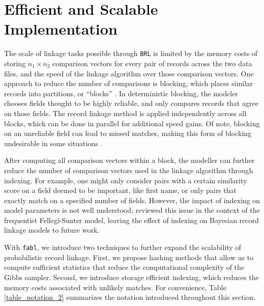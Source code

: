 \documentclass[ba]{imsart}
\begin{document}
\section{Efficient and Scalable Implementation}
\label{sec:efficiency}

The scale of linkage tasks possible through \texttt{BRL} is limited by the memory costs of storing $n_1 \times n_2$ comparison vectors for every pair of records across the two data files, and the speed of the linkage algorithm over those comparison vectors. One approach to reduce the number of comparisons is blocking, which places similar records into partitions, or ``blocks'' \citep{christen2019data}. In deterministic blocking, the modeler chooses fields thought to be highly reliable, and only compares records that agree on those fields. The record linkage method is  applied independently across all blocks, which can be done in parallel for additional speed gains. Of note, blocking on an unreliable field can lead to missed matches, making this form of blocking undesirable in some situations \citep{steorts_comparison_2014}.

After computing all comparison vectors within a block, the modeller can further reduce the number of comparison vectors used in the linkage algorithm through indexing. For example, one might only consider pairs with a certain similarity score on a field deemed to be important, like first name, or only pairs that exactly match on a specified number of fields. However, the impact of indexing on model parameters is not well understood; \citep{murray2016probabilistic} reviewed this issue in the context of the frequentist Fellegi-Sunter model, leaving the effect of indexing on Bayesian record linkage models to future work.

With \texttt{fabl}, we introduce two techniques to further expand the scalability of probabilistic record linkage. First, we propose hashing methods that allow us to compute sufficient statistics that reduce the computational complexity of the Gibbs sampler. Second, we introduce storage efficient indexing, which reduces the memory costs associated with unlikely matches. For convenience, Table \ref{table_notation_2} summarizes the notation introduced throughout this section.
\end{document}
